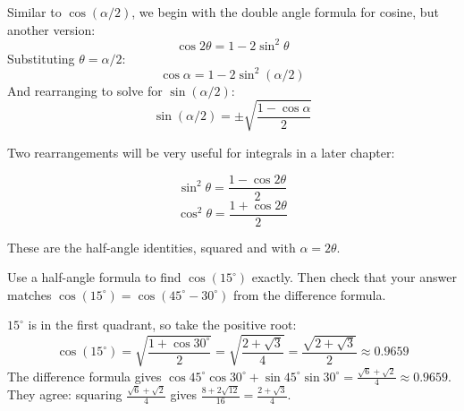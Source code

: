 \begin{Answer}[ref = half_sine]
Similar to $\cos{ \left( \alpha / 2 \right)}$, we begin with the double angle 
formula for cosine, but another version:
$$\cos{2\theta} = 1 - 2\sin^2{\theta}$$
Substituting $\theta = \alpha / 2$:
$$\cos{\alpha} = 1 - 2\sin^2{ \left( \alpha / 2 \right)}$$
And rearranging to solve for $\sin{ \left( \alpha / 2 \right) }$:
$$\sin{ \left( \alpha / 2 \right) } = \pm \sqrt{\frac{1 - \cos{\alpha}}{2}}$$
\end{Answer}

Two rearrangements will be very useful
for integrals in a later chapter:
\begin{mdframed}[style=important, frametitle={Squared Trigonometric 
Identities}]
$$\sin^2{\theta} = \frac{1 - \cos{2\theta}}{2}$$
$$\cos^2{\theta} = \frac{1 + \cos{2\theta}}{2}$$
\end{mdframed}

These are the half-angle identities, squared and with $\alpha = 2\theta$.

\begin{Exercise}[title={Half of thirty}, label=half_angle_15]
Use a half-angle formula to find $\cos(15^\circ)$ exactly. Then check that
your answer matches $\cos(15^\circ) = \cos(45^\circ - 30^\circ)$ from the
difference formula.
\end{Exercise}
\begin{Answer}[ref=half_angle_15]
$15^\circ$ is in the first quadrant, so take the positive root:
$$\cos(15^\circ) = \sqrt{\frac{1 + \cos 30^\circ}{2}} = \sqrt{\frac{2 + \sqrt{3}}{4}} = \frac{\sqrt{2 + \sqrt{3}}}{2} \approx 0.9659$$
The difference formula gives
$\cos 45^\circ \cos 30^\circ + \sin 45^\circ \sin 30^\circ = \frac{\sqrt{6} + \sqrt{2}}{4} \approx 0.9659$.
They agree: squaring $\frac{\sqrt{6} + \sqrt{2}}{4}$ gives
$\frac{8 + 2\sqrt{12}}{16} = \frac{2 + \sqrt{3}}{4}$.
\end{Answer} 